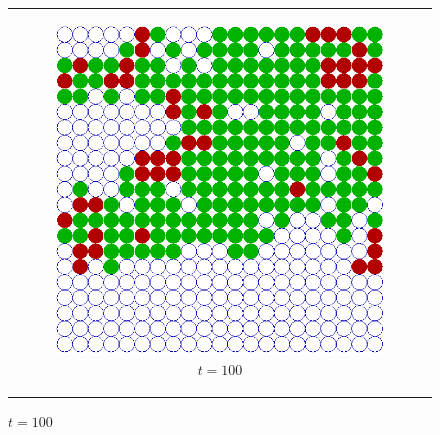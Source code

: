 \begin{figure}
\begin{center}
	\begin{tabular}{c}
		\begin{subfigure}[b]{0.3\textwidth}
			\centering
			\includegraphics[width=1\textwidth, angle=0]{./fig/step5_environment/SIR_environment_30x30agents_t100_01dt.png}
			\caption{$t = 100$}
			\label{fig:sir_env_t100}
		\end{subfigure}
    	
    	\\
    	

\end{tabular}
\end{center}
\end{figure}
